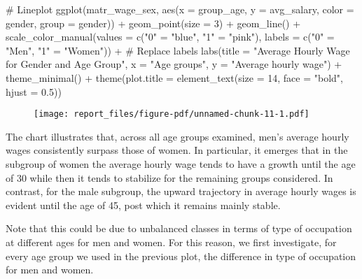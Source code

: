 \documentclass[
  letterpaper,
  DIV=11,
  numbers=noendperiod]{scrartcl}
\newenvironment{Shaded}{\begin{snugshade}}{\end{snugshade}}
\newcommand{\AttributeTok}[1]{\textcolor[rgb]{0.40,0.45,0.13}{#1}}
\newcommand{\CommentTok}[1]{\textcolor[rgb]{0.37,0.37,0.37}{#1}}
\newcommand{\DecValTok}[1]{\textcolor[rgb]{0.68,0.00,0.00}{#1}}
\newcommand{\FloatTok}[1]{\textcolor[rgb]{0.68,0.00,0.00}{#1}}
\newcommand{\FunctionTok}[1]{\textcolor[rgb]{0.28,0.35,0.67}{#1}}
\newcommand{\NormalTok}[1]{\textcolor[rgb]{0.00,0.23,0.31}{#1}}
\newcommand{\OtherTok}[1]{\textcolor[rgb]{0.00,0.23,0.31}{#1}}
\newcommand{\SpecialCharTok}[1]{\textcolor[rgb]{0.37,0.37,0.37}{#1}}
\newcommand{\StringTok}[1]{\textcolor[rgb]{0.13,0.47,0.30}{#1}}
\begin{document}
\begin{Shaded}
\begin{Highlighting}[]
\CommentTok{\# Lineplot}
\FunctionTok{ggplot}\NormalTok{(matr\_wage\_sex, }\FunctionTok{aes}\NormalTok{(}\AttributeTok{x =}\NormalTok{ group\_age, }\AttributeTok{y =}\NormalTok{ avg\_salary, }
                          \AttributeTok{color =}\NormalTok{ gender, }\AttributeTok{group =}\NormalTok{ gender)) }\SpecialCharTok{+}
  \FunctionTok{geom\_point}\NormalTok{(}\AttributeTok{size =} \DecValTok{3}\NormalTok{) }\SpecialCharTok{+} \FunctionTok{geom\_line}\NormalTok{() }\SpecialCharTok{+}
  \FunctionTok{scale\_color\_manual}\NormalTok{(}\AttributeTok{values =} \FunctionTok{c}\NormalTok{(}\StringTok{"0"} \OtherTok{=} \StringTok{"blue"}\NormalTok{, }\StringTok{"1"} \OtherTok{=} \StringTok{"pink"}\NormalTok{),}
                     \AttributeTok{labels =} \FunctionTok{c}\NormalTok{(}\StringTok{"0"} \OtherTok{=} \StringTok{"Men"}\NormalTok{, }\StringTok{"1"} \OtherTok{=} \StringTok{"Women"}\NormalTok{)) }\SpecialCharTok{+}  \CommentTok{\# Replace labels}
  \FunctionTok{labs}\NormalTok{(}\AttributeTok{title =} \StringTok{"Average Hourly Wage for Gender and Age Group"}\NormalTok{,}
       \AttributeTok{x =} \StringTok{"Age groups"}\NormalTok{, }\AttributeTok{y =} \StringTok{"Average hourly wage"}\NormalTok{) }\SpecialCharTok{+}
  \FunctionTok{theme\_minimal}\NormalTok{() }\SpecialCharTok{+}
  \FunctionTok{theme}\NormalTok{(}\AttributeTok{plot.title =} \FunctionTok{element\_text}\NormalTok{(}\AttributeTok{size =} \DecValTok{14}\NormalTok{, }\AttributeTok{face =} \StringTok{"bold"}\NormalTok{, }\AttributeTok{hjust =} \FloatTok{0.5}\NormalTok{))}
\end{Highlighting}
\end{Shaded}

\begin{figure}[H]

{\centering \texttt{[image: report\_files/figure-pdf/unnamed-chunk-11-1.pdf]}

}

\end{figure}

The chart illustrates that, across all age groups examined, men's
average hourly wages consistently surpass those of women. In particular,
it emerges that in the subgroup of women the average hourly wage tends
to have a growth until the age of 30 while then it tends to stabilize
for the remaining groups considered. In contrast, for the male subgroup,
the upward trajectory in average hourly wages is evident until the age
of 45, post which it remains mainly stable.

Note that this could be due to unbalanced classes in terms of type of
occupation at different ages for men and women. For this reason, we
first investigate, for every age group we used in the previous plot, the
difference in type of occupation for men and women.
\end{document}
